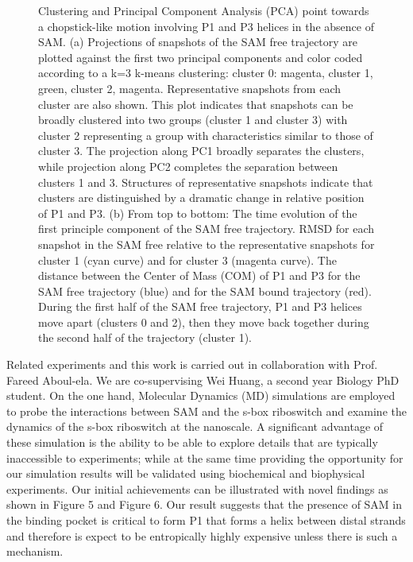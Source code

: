\documentclass[a4paper,10pt]{article}
\begin{document}
\begin{figure}
\caption{Clustering and Principal Component Analysis (PCA) point towards a chopstick-like 
motion involving P1 and P3 helices in the absence of SAM. 
(a) Projections of snapshots of the SAM free trajectory are plotted against the first two principal 
components and color coded according to a k=3 k-means clustering: cluster 0: magenta, cluster 1, 
green, cluster 2, magenta. Representative snapshots from each cluster are also shown. This plot 
indicates that snapshots can be broadly clustered into two groups (cluster 1 and cluster 3) with 
cluster 2 representing a group with characteristics similar to those of cluster 3. The projection 
along PC1 broadly separates the clusters, while projection along PC2 completes the separation 
between clusters 1 and 3. Structures of representative snapshots indicate that clusters are 
distinguished by a dramatic change in relative position of P1 and P3. (b) From top to bottom: 
The time evolution of the first principle component of the SAM free trajectory. RMSD for each snapshot in the SAM free relative to the 
representative snapshots for cluster 1 (cyan curve) and for cluster 3 (magenta curve). The 
distance between the Center of Mass (COM) of P1 and P3 for the SAM free trajectory (blue) and for 
the SAM bound trajectory (red).  During the first half of the SAM free trajectory, P1 and P3 helices move apart 
(clusters 0 and 2), then they move back together during the second half of the trajectory (cluster 
1).}

\end{figure}

Related experiments and this work is carried out in collaboration with Prof. Fareed Aboul-ela. We are co-supervising Wei Huang, a second year Biology PhD student.  On the one hand, Molecular Dynamics (MD) simulations are employed to probe the interactions between SAM and the s-box riboswitch and examine the dynamics of the s-box riboswitch at the nanoscale. A significant advantage of these simulation is the ability to be able to explore details that are typically inaccessible to experiments; while at the same time providing the opportunity for our simulation results will be validated using biochemical and biophysical experiments. Our initial achievements can be illustrated with novel findings as shown in Figure 5 and Figure 6.  Our result suggests that the presence of SAM in the binding pocket is critical to form P1 that forms a helix between distal strands and therefore is expect to be entropically highly expensive unless there is such a mechanism.
\end{document}
